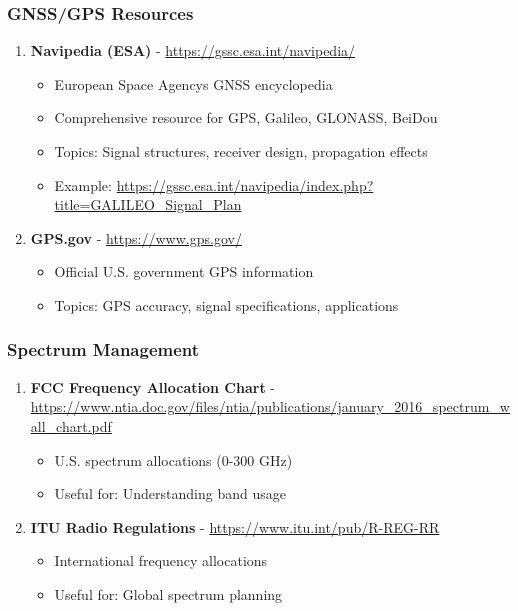 \subsubsection{GNSS/GPS Resources}\label{gnssgps-resources}

\begin{enumerate}
\def\labelenumi{\arabic{enumi}.}
\setcounter{enumi}{44}
\tightlist
\item
  \textbf{Navipedia (ESA)} - \url{https://gssc.esa.int/navipedia/}

  \begin{itemize}
  \tightlist
  \item
    European Space Agency\textquotesingle s GNSS encyclopedia
  \item
    Comprehensive resource for GPS, Galileo, GLONASS, BeiDou
  \item
    Topics: Signal structures, receiver design, propagation effects
  \item
    Example: \url{https://gssc.esa.int/navipedia/index.php?title=GALILEO_Signal_Plan}
  \end{itemize}
\item
  \textbf{GPS.gov} - \url{https://www.gps.gov/}

  \begin{itemize}
  \tightlist
  \item
    Official U.S. government GPS information
  \item
    Topics: GPS accuracy, signal specifications, applications
  \end{itemize}
\end{enumerate}

\subsubsection{Spectrum Management}\label{spectrum-management}

\begin{enumerate}
\def\labelenumi{\arabic{enumi}.}
\setcounter{enumi}{46}
\tightlist
\item
  \textbf{FCC Frequency Allocation Chart} - \url{https://www.ntia.doc.gov/files/ntia/publications/january_2016_spectrum_wall_chart.pdf}

  \begin{itemize}
  \tightlist
  \item
    U.S. spectrum allocations (0-300 GHz)
  \item
    Useful for: Understanding band usage
  \end{itemize}
\item
  \textbf{ITU Radio Regulations} - \url{https://www.itu.int/pub/R-REG-RR}

  \begin{itemize}
  \tightlist
  \item
    International frequency allocations
  \item
    Useful for: Global spectrum planning
  \end{itemize}
\end{enumerate}

